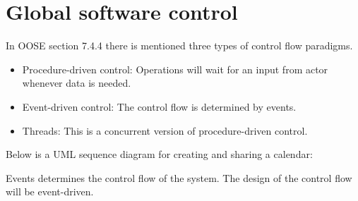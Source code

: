 \section{Global software control}

In OOSE section 7.4.4 there is mentioned three types of control flow paradigms. 

\begin{itemize}
	\item Procedure-driven control: Operations will wait for an input from actor whenever data is needed. 
	\item Event-driven control: The control flow is determined by events.
	\item Threads: This is a concurrent version of procedure-driven control.
\end{itemize}

 Below is a UML sequence diagram for creating and sharing a calendar:

 Events determines the control flow of the system. The design of the control flow will be event-driven. 